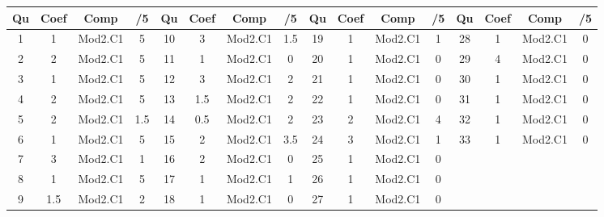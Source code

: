 \footnotesize 
\begin{center} 
\begin{tabular}{|c|c|c|c||c|c|c|c||c|c|c|c||c|c|c|c|} 
\hline \textbf{Qu} & \textbf{Coef} & \textbf{Comp} & \textbf{/5} & \textbf{Qu} & \textbf{Coef} & \textbf{Comp} & \textbf{/5} & \textbf{Qu} & \textbf{Coef} & \textbf{Comp} & \textbf{/5} & \textbf{Qu} & \textbf{Coef} & \textbf{Comp} & \textbf{/5} \\ 
\hline 
\hline 
1 & 1 & Mod2.C1 & 5 & 10 & 3 & Mod2.C1 & 1.5 & 19 & 1 & Mod2.C1 & 1 & 28 & 1 & Mod2.C1 & 0 \\ \hline 
2 & 2 & Mod2.C1 & 5 & 11 & 1 & Mod2.C1 & 0 & 20 & 1 & Mod2.C1 & 0 & 29 & 4 & Mod2.C1 & 0 \\ \hline 
3 & 1 & Mod2.C1 & 5 & 12 & 3 & Mod2.C1 & 2 & 21 & 1 & Mod2.C1 & 0 & 30 & 1 & Mod2.C1 & 0 \\ \hline 
4 & 2 & Mod2.C1 & 5 & 13 & 1.5 & Mod2.C1 & 2 & 22 & 1 & Mod2.C1 & 0 & 31 & 1 & Mod2.C1 & 0 \\ \hline 
5 & 2 & Mod2.C1 & 1.5 & 14 & 0.5 & Mod2.C1 & 2 & 23 & 2 & Mod2.C1 & 4 & 32 & 1 & Mod2.C1 & 0 \\ \hline 
6 & 1 & Mod2.C1 & 5 & 15 & 2 & Mod2.C1 & 3.5 & 24 & 3 & Mod2.C1 & 1 & 33 & 1 & Mod2.C1 & 0 \\ \hline 
7 & 3 & Mod2.C1 & 1 & 16 & 2 & Mod2.C1 & 0 & 25 & 1 & Mod2.C1 & 0 &  &  &  &  \\ \hline 

8 & 1 & Mod2.C1 & 5 & 17 & 1 & Mod2.C1 & 1 & 26 & 1 & Mod2.C1 & 0 &  &  &  &  \\ \hline 

9 & 1.5 & Mod2.C1 & 2 & 18 & 1 & Mod2.C1 & 0 & 27 & 1 & Mod2.C1 & 0 &  &  &  &  \\ \hline 

\end{tabular} 
\end{center} 
\normalsize 
